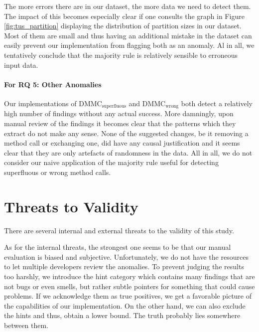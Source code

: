 The more errors there are in our dataset, the more data we need to detect them.
The impact of this becomes especially clear if one consults the graph in Figure \ref{fig:tus_partition} displaying the distribution of partition sizes in our dataset.
Most of them are small and thus having an additional mistake in the dataset can easily prevent our implementation from flagging both as an anomaly.
Al in all, we tentatively conclude that the majority rule is relatively sensible to erroneous input data.

\paragraph{For RQ 5: Other Anomalies}

Our implementations of $\text{DMMC}_\text{superfluous}$ and $\text{DMMC}_\text{wrong}$ both detect a relatively high number of findings without any actual success.
More damningly, upon manual review of the findings it becomes clear that the patterns which they extract do not make any sense.
None of the suggested changes, be it removing a method call or exchanging one, did have any causal justification and it seems clear that they are only artefacts of randomness in the data.
All in all, we do not consider our naive application of the majority rule useful for detecting superfluous or wrong method calls.

\section{Threats to Validity}

There are several internal and external threats to the validity of this study.

As for the internal threats, the strongest one seems to be that our manual evaluation is biased and subjective.
Unfortunately, we do not have the resources to let multiple developers review the anomalies.
To prevent judging the results too harshly, we introduce the hint category which contains many findings that are not bugs or even smells, but rather subtle pointers for something that could cause problems.
If we acknowledge them as true positives, we get a favorable picture of the capabilities of our implementation.
On the other hand, we can also exclude the hints and thus, obtain a lower bound.
The truth probably lies somewhere between them.

